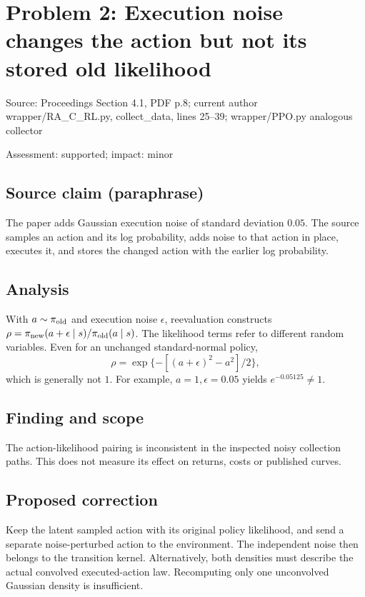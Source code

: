\documentclass[11pt]{article}
\begin{document}
\section*{Problem 2: Execution noise changes the action but not its stored old likelihood}

Source: Proceedings Section 4.1, PDF p.8; current author wrapper/RA\_C\_RL.py, collect\_data, lines 25–39; wrapper/PPO.py analogous collector

Assessment: supported; impact: minor

\subsection*{Source claim (paraphrase)}

The paper adds Gaussian execution noise of standard deviation \(0.05\). The source samples an action and its log probability, adds noise to that action in place, executes it, and stores the changed action with the earlier log probability.

\subsection*{Analysis}

With \(a\sim\pi_{\rm old}\) and execution noise \(\epsilon\), reevaluation constructs \(\rho=\pi_{\rm new}(a+\epsilon\mid s)/\pi_{\rm old}(a\mid s)\). The likelihood terms refer to different random variables. Even for an unchanged standard-normal policy, \[\rho=\exp\{-[(a+\epsilon)^2-a^2]/2\},\] which is generally not \(1\). For example, \(a=1,\epsilon=0.05\) yields \(e^{-0.05125}\ne1\).

\subsection*{Finding and scope}

The action-likelihood pairing is inconsistent in the inspected noisy collection paths. This does not measure its effect on returns, costs or published curves.

\subsection*{Proposed correction}

Keep the latent sampled action with its original policy likelihood, and send a separate noise-perturbed action to the environment. The independent noise then belongs to the transition kernel. Alternatively, both densities must describe the actual convolved executed-action law. Recomputing only one unconvolved Gaussian density is insufficient.
\end{document}
